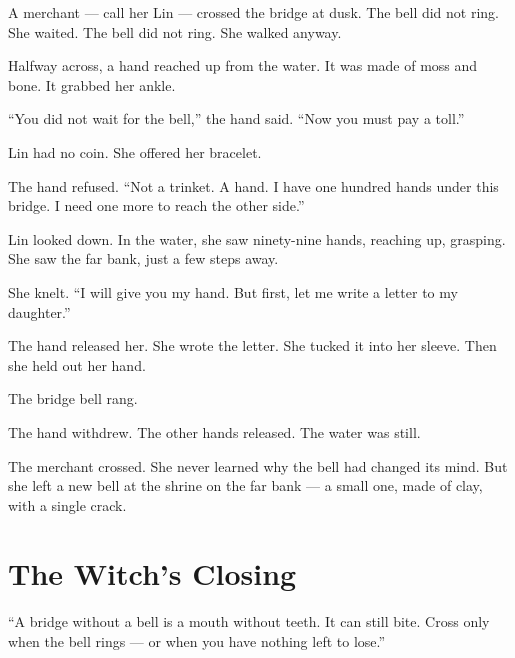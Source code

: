 \documentclass[10pt,twoside]{book}
\begin{document}
A merchant --- call her Lin --- crossed the bridge at dusk. The bell did not ring. She waited. The bell did not ring. She walked anyway.

Halfway across, a hand reached up from the water. It was made of moss and bone. It grabbed her ankle.

``You did not wait for the bell,'' the hand said. ``Now you must pay a toll.''

Lin had no coin. She offered her bracelet.

The hand refused. ``Not a trinket. A hand. I have one hundred hands under this bridge. I need one more to reach the other side.''

Lin looked down. In the water, she saw ninety-nine hands, reaching up, grasping. She saw the far bank, just a few steps away.

She knelt. ``I will give you my hand. But first, let me write a letter to my daughter.''

The hand released her. She wrote the letter. She tucked it into her sleeve. Then she held out her hand.

The bridge bell rang.

The hand withdrew. The other hands released. The water was still.

The merchant crossed. She never learned why the bell had changed its mind. But she left a new bell at the shrine on the far bank --- a small one, made of clay, with a single crack.

\section*{The Witch's Closing}
``A bridge without a bell is a mouth without teeth. It can still bite. Cross only when the bell rings --- or when you have nothing left to lose.''
\end{document}
